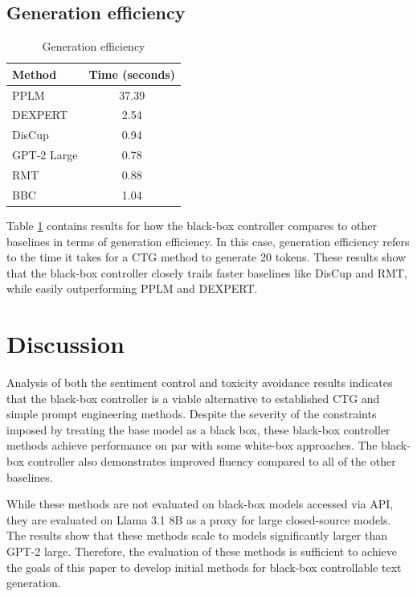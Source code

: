 \documentclass[phd,electronic,oneside,twosidetoc,letterpaper,chaptercenter,parttop,lof]{byumsphd}
\begin{document}
\subsection{Generation efficiency}

\begin{table}[t]
  \caption{Generation efficiency}
  \label{generation-efficiency}
  \centering
  \small
  \begin{tabular}{lc}
    \toprule
    \textbf{Method} & \textbf{Time (seconds)} \\
    \midrule
    PPLM & 37.39 \\
    DEXPERT & 2.54 \\
    DisCup & 0.94 \\
    GPT-2 Large & 0.78 \\
    RMT & 0.88 \\
    BBC & 1.04 \\
    \bottomrule
  \end{tabular}
\end{table}

Table \ref{generation-efficiency} contains results for how the black-box controller compares to other baselines in terms of generation efficiency.
In this case, generation efficiency refers to the time it takes for a CTG method to generate 20 tokens.
These results show that the black-box controller closely trails faster baselines like DisCup and RMT, while easily outperforming PPLM and DEXPERT. 

\section{Discussion}
\label{discussion}

Analysis of both the sentiment control and toxicity avoidance results indicates that the black-box controller is a viable alternative to established CTG and simple prompt engineering methods.
Despite the severity of the constraints imposed by treating the base model as a black box, these black-box controller methods achieve performance on par with some white-box approaches.
The black-box controller also demonstrates improved fluency compared to all of the other baselines. 

While these methods are not evaluated on black-box models accessed via API, they are evaluated on Llama 3.1 8B as a proxy for large closed-source models.
The results show that these methods scale to models significantly larger than GPT-2 large.
Therefore, the evaluation of these methods is sufficient to achieve the goals of this paper to develop initial methods for black-box controllable text generation.
\end{document}

